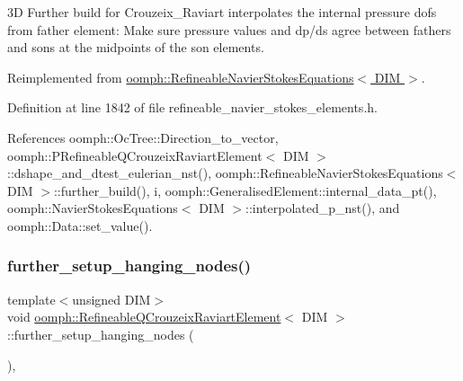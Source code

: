 3D Further build for Crouzeix\+\_\+\+Raviart interpolates the internal pressure dofs from father element\+: Make sure pressure values and dp/ds agree between fathers and sons at the midpoints of the son elements. 

Reimplemented from \hyperlink{classoomph_1_1RefineableNavierStokesEquations_a7afd6250585ea597c3df65b8c7744da4}{oomph\+::\+Refineable\+Navier\+Stokes\+Equations$<$ D\+I\+M $>$}.



Definition at line 1842 of file refineable\+\_\+navier\+\_\+stokes\+\_\+elements.\+h.



References oomph\+::\+Oc\+Tree\+::\+Direction\+\_\+to\+\_\+vector, oomph\+::\+P\+Refineable\+Q\+Crouzeix\+Raviart\+Element$<$ D\+I\+M $>$\+::dshape\+\_\+and\+\_\+dtest\+\_\+eulerian\+\_\+nst(), oomph\+::\+Refineable\+Navier\+Stokes\+Equations$<$ D\+I\+M $>$\+::further\+\_\+build(), i, oomph\+::\+Generalised\+Element\+::internal\+\_\+data\+\_\+pt(), oomph\+::\+Navier\+Stokes\+Equations$<$ D\+I\+M $>$\+::interpolated\+\_\+p\+\_\+nst(), and oomph\+::\+Data\+::set\+\_\+value().

\mbox{\label{classoomph_1_1RefineableQCrouzeixRaviartElement_a9e248e7b6cf379a2602d8b0e1a7f5431}} 
\subsubsection{\texorpdfstring{further\+\_\+setup\+\_\+hanging\+\_\+nodes()}{further\_setup\_hanging\_nodes()}}
{\footnotesize\ttfamily template$<$unsigned D\+IM$>$ \\
void \hyperlink{classoomph_1_1RefineableQCrouzeixRaviartElement}{oomph\+::\+Refineable\+Q\+Crouzeix\+Raviart\+Element}$<$ D\+IM $>$\+::further\+\_\+setup\+\_\+hanging\+\_\+nodes (\begin{DoxyParamCaption}{ }\end{DoxyParamCaption})\hspace{0.3cm}{\ttfamily [inline]}, {\ttfamily [virtual]}}



